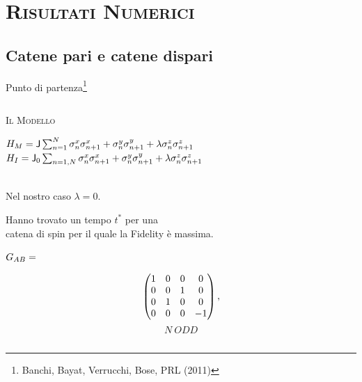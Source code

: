 \documentclass[xcolor=x11names,compress]{beamer}
\renewcommand{\(}{\begin{columns}}
\renewcommand{\)}{\end{columns}}
\newcommand{\<}[1]{\begin{column}{#1}}
\renewcommand{\>}{\end{column}}
\begin{document}
\section{\scshape Risultati Numerici}
\subsection{Catene pari e catene dispari}
\begin{frame}{Punto di partenza\footnote{Banchi, Bayat, Verrucchi, Bose, PRL (2011)}}

\vspace{0.3cm}

\begin{columns}[c]
\begin{column}{0.6\textwidth}{\textsc{\textcolor{myNetworks}{Il Modello}}}

\vspace{0.3cm}

\textcolor{myNetText}{
\scriptsize{
$H_{\footnotesize{M}} = \textsf{J} \sum_{n = 1}^N \sigma^x_n \sigma^x_{n+1}  + \sigma^y_n \sigma^y_{n+1} + \lambda \sigma^z_n \sigma^z_{n+1}$
\\
$H_{\footnotesize{I}} = \textsf{J}_0 \sum_{n = 1,N} \sigma^x_n \sigma^x_{n+1}  + \sigma^y_n \sigma^y_{n+1} + \lambda \sigma^z_n \sigma^z_{n+1}
$
} }

\textcolor{myNetText}{
\scriptsize{\\ Nel nostro caso $\lambda = 0$.}
}
\vspace{0.5cm}

\textcolor{myNetText}{
\footnotesize{
Hanno trovato un tempo $t^*$ per una \\ catena di spin per il quale la Fidelity è massima.
}}
\begin{center}
$G_{\footnotesize{AB}} = $
\end{center}

\vspace{-1.2cm}

\begin{center}
\begin{minipage}{0.8\textwidth}
\begin{multicols}{2}
\tiny{

$$
\begin{pmatrix}
1 & 0 & 0 & 0\\
	0 & 0 & 1 & 0\\
	0 & 1 & 0 & 0\\
	0 & 0 & 0 & -1\\
\end{pmatrix}\small{,}
$$
$$N\ ODD$$
\columnbreak

}
\end{multicols}
\end{minipage}
\end{center}
\end{column}
\end{columns}
\end{frame}
\end{document}
